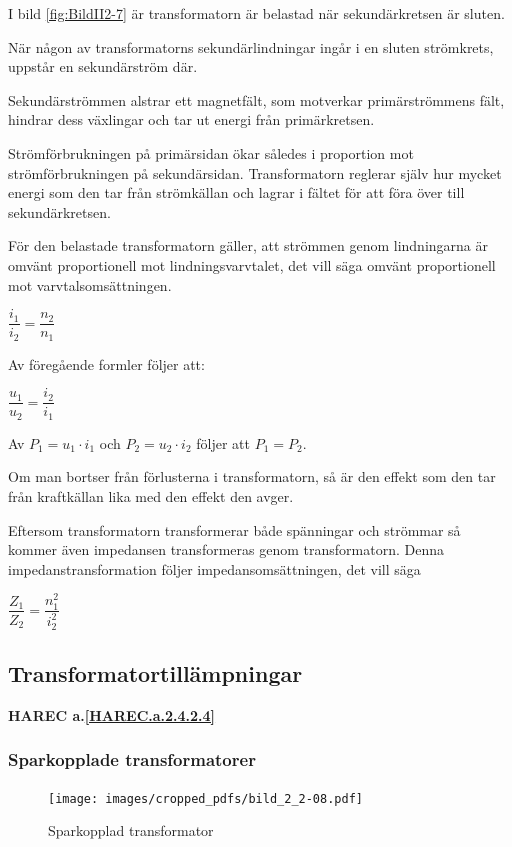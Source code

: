 I bild \ref{fig:BildII2-7} är transformatorn är belastad när sekundärkretsen
är sluten.

När någon av transformatorns sekundärlindningar ingår i en sluten strömkrets,
uppstår en sekundärström där.

Sekundärströmmen alstrar ett magnetfält, som motverkar primärströmmens fält,
hindrar dess växlingar och tar ut energi från primärkretsen.

Strömförbrukningen på primärsidan ökar således i proportion mot
strömförbrukningen på sekundärsidan. Transformatorn reglerar själv hur mycket
energi som den tar från strömkällan och lagrar i fältet för att föra över
till sekundärkretsen.

För den belastade transformatorn gäller, att strömmen genom lindningarna är
omvänt proportionell mot lindningsvarvtalet, det vill säga omvänt proportionell mot
varvtalsomsättningen.

\(\dfrac{i_1}{i_2} = \dfrac{n_2}{n_1}\)

Av föregående formler följer att:

\(\dfrac{u_1}{u_2} = \dfrac{i_2}{i_1}\)

Av \(P_1 = u_1 \cdot i_1\) och \(P_2 = u_2 \cdot i_2\) följer att \(P_1 = P_2\).

Om man bortser från förlusterna i transformatorn, så är den effekt som den tar
från kraftkällan lika med den effekt den avger.

Eftersom transformatorn transformerar både spänningar och strömmar så kommer
även impedansen transformeras genom transformatorn.
Denna impedanstransformation följer impedansomsättningen, det vill säga

\(\dfrac{Z_1}{Z_2} = \dfrac{n_1^2}{i_2^2}\)

\subsection{Transformatortillämpningar}
\textbf{HAREC a.\ref{HAREC.a.2.4.2.4}\label{myHAREC.a.2.4.2.4}}

\subsubsection{Sparkopplade transformatorer}

\begin{figure}[ht]
\begin{center}
\texttt{[image: images/cropped\_pdfs/bild\_2\_2-08.pdf]}
\caption{Sparkopplad transformator}
\label{fig:BildII2-8}
\end{center}
\end{figure}

